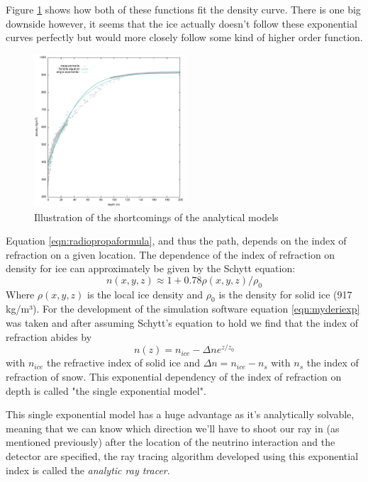 \documentclass[11pt,a4paper,faculty=we,language=en,doctype=report]{cls/ugent-doc}
\begin{document}
Figure \ref{fig:DensityMeasurements} shows how both of these functions fit the
density curve.  There is one big downside however, it seems that the ice
actually doesn't follow these exponential curves perfectly but would more
closely follow some kind of higher order function.
\begin{figure}
  \centering
	\includegraphics[width=0.5\textwidth]{Density_measurements2.pdf}
	\caption{Illustration of the shortcomings of the analytical models}
	\label{fig:DensityMeasurements}
\end{figure}

Equation \ref{eqn:radiopropaformula}, and thus the path, depends on the index
of refraction on a given location.  The dependence of the index of refraction
on density for ice can approximately be given by the Schytt equation\cite{Barwick_2018}:
\begin{equation} 
	n(x,y,z) \approx 1 + 0.78\rho(x,y,z)/\rho_0 \label{eqn:Schytt}
\end{equation} 
Where $\rho(x,y,z)$ is the local ice density and $\rho_0$ is the
density for solid ice (917 kg/m³).  For the development of the simulation
software equation \ref{eqn:myderiexp} was taken and after assuming Schytt's
equation to hold we find that the index of refraction abides by
\begin{equation}
	\label{eqn:expn}
	n(z) = n_{ice} - \Delta n e^{z/z_0}
\end{equation}
with $n_{ice}$ the refractive index of solid ice and $\Delta n = n_{ice} - n_s$
with $n_s$ the index of refraction of snow. This exponential dependency of the
index of refraction on depth is called "the single exponential model".  

This single exponential model has a huge advantage as it's analytically
solvable, meaning that we can know which direction we'll have to shoot our ray
in (as mentioned previously) after the location of the neutrino interaction and
the detector are specified, the ray tracing algorithm developed using this
exponential index is called the \textit{analytic ray tracer}.
\end{document}

